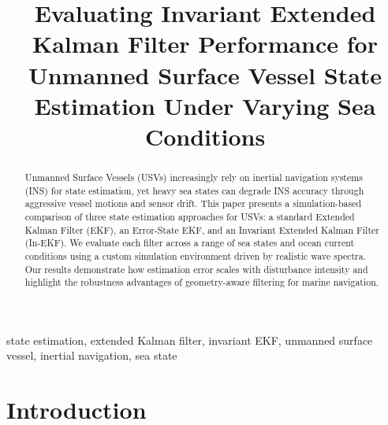 \documentclass[conference]{IEEEtran}
\begin{document}
\title{Evaluating Invariant Extended Kalman Filter Performance for Unmanned Surface Vessel State Estimation Under Varying Sea Conditions}

\author{
  \and
  \and
}

\maketitle

\begin{abstract}
Unmanned Surface Vessels (USVs) increasingly rely on inertial navigation systems (INS) for state estimation, yet heavy sea states can degrade INS accuracy through aggressive vessel motions and sensor drift. This paper presents a simulation-based comparison of three state estimation approaches for USVs: a standard Extended Kalman Filter (EKF), an Error-State EKF, and an Invariant Extended Kalman Filter (In-EKF). We evaluate each filter across a range of sea states and ocean current conditions using a custom simulation environment driven by realistic wave spectra. Our results demonstrate how estimation error scales with disturbance intensity and highlight the robustness advantages of geometry-aware filtering for marine navigation.
\end{abstract}

\begin{IEEEkeywords}
state estimation, extended Kalman filter, invariant EKF, unmanned surface vessel, inertial navigation, sea state
\end{IEEEkeywords}

\section{Introduction}
\label{sec:intro}
\end{document}
